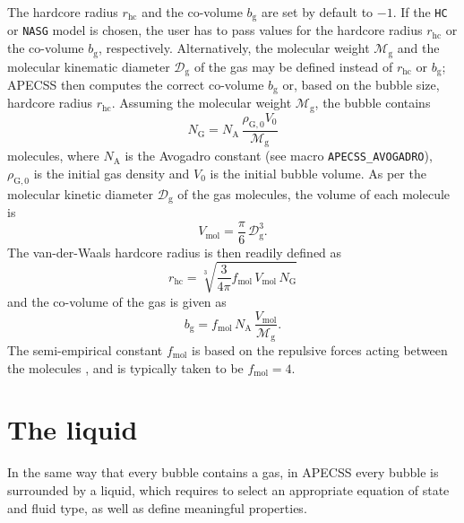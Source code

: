 The hardcore radius $r_\mathrm{hc}$ and the co-volume $b_\mathrm{g}$ are set by default to $-1$. If the {\tt HC} or {\tt NASG} model is chosen, the user has to pass values for the hardcore radius $r_\mathrm{hc}$ or the co-volume $b_\mathrm{g}$, respectively. Alternatively, the molecular weight $\mathcal{M}_{\text{g}}$ and the molecular kinematic diameter $\mathcal{D}_{\text{g}}$ of the gas may be defined instead of $r_\mathrm{hc}$ or $b_\mathrm{g}$; APECSS then computes the correct co-volume $b_\mathrm{g}$ or, based on the bubble size, hardcore radius $r_\mathrm{hc}$. Assuming the molecular weight $\mathcal{M}_{\text{g}}$, the bubble contains 
\begin{equation}
    N_\mathrm{G} = N_\mathrm{A} \, \frac{\rho_{\mathrm{G},0} V_0}{\mathcal{M}_{\text{g}}} 
\end{equation}
molecules, where $N_\mathrm{A}$ is the Avogadro constant (see macro {\tt APECSS\_AVOGADRO}), $\rho_{\mathrm{G},0}$ is the initial gas density and $V_0$ is the initial bubble volume. As per the molecular kinetic diameter $\mathcal{D}_{\text{g}}$ of the gas molecules, the volume of each molecule is
\begin{equation}
    V_\mathrm{mol} = \frac{\pi}{6} \, \mathcal{D}_{\text{g}}^3.
\end{equation}
The van-der-Waals hardcore radius is then readily defined as
\begin{equation}
    r_\mathrm{hc} = \sqrt[3]{\frac{3}{4 \pi} f_\mathrm{mol} \, V_\mathrm{mol} \, N_\mathrm{G}}
\end{equation}
and the co-volume of the gas is given as
\begin{equation}
    b_\mathrm{g} = f_\mathrm{mol} \, N_\mathrm{A} \, \frac{V_\mathrm{mol}}{\mathcal{M}_{\text{g}}}.
\end{equation}
The semi-empirical constant $f_\mathrm{mol}$ is based on the repulsive forces acting between the molecules \citep{Kontogeorgis2019,vanderWaals1998}, and is typically taken to be $f_\mathrm{mol}=4$.


\section{The liquid}
\label{sec:liquid}

In the same way that every bubble contains a gas, in APECSS every bubble is surrounded by a liquid, which requires to select an appropriate equation of state and fluid type, as well as define meaningful properties.

\vspace{0.8em}

